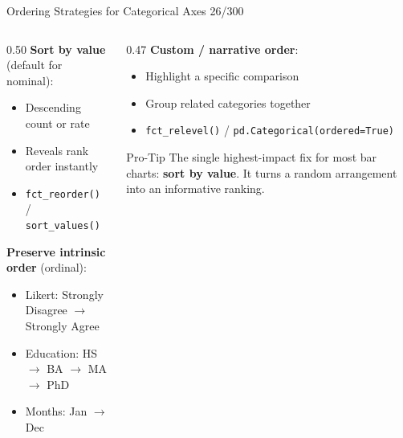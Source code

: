 \documentclass[10pt]{beamer}
\newcommand{\smark}[1]{\hfill{\scriptsize\color{codegray}#1}}
\begin{document}
\begin{frame}{Ordering Strategies for Categorical Axes}
\smark{26/300}
\begin{columns}[T]
\begin{column}{0.50\textwidth}
    \textbf{Sort by value} (default for nominal):
    \begin{itemize}
        \item Descending count or rate
        \item Reveals rank order instantly
        \item \texttt{fct\_reorder()} / \texttt{sort\_values()}
    \end{itemize}
    \vspace{0.2cm}
    \textbf{Preserve intrinsic order} (ordinal):
    \begin{itemize}
        \item Likert: Strongly Disagree $\to$ Strongly Agree
        \item Education: HS $\to$ BA $\to$ MA $\to$ PhD
        \item Months: Jan $\to$ Dec
    \end{itemize}
\end{column}
\begin{column}{0.47\textwidth}
    \textbf{Custom / narrative order}:
    \begin{itemize}
        \item Highlight a specific comparison
        \item Group related categories together
        \item \texttt{fct\_relevel()} / \texttt{pd.Categorical(ordered=True)}
    \end{itemize}
    \vspace{0.2cm}
    \begin{alertblock}{Pro-Tip}
        \scriptsize The single highest-impact fix for most bar charts: \textbf{sort by value}. It turns a random arrangement into an informative ranking.
    \end{alertblock}
\end{column}
\end{columns}
\end{frame}
\end{document}
